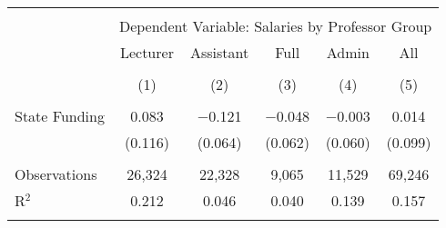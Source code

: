 
\begin{tabular}{@{\extracolsep{5pt}}lccccc} 
\\[-1.8ex]\hline 
\hline \\[-1.8ex] 
 & \multicolumn{5}{c}{Dependent Variable: Salaries by Professor Group} \\ 
\cline{2-6} 
 & Lecturer & Assistant & Full & Admin & All \\ 
\\[-1.8ex] & (1) & (2) & (3) & (4) & (5)\\ 
\hline \\[-1.8ex] 
 State Funding & 0.083 & $-$0.121 & $-$0.048 & $-$0.003 & 0.014 \\ 
  & (0.116) & (0.064) & (0.062) & (0.060) & (0.099) \\ 
 \hline \\[-1.8ex] 
Observations & 26,324 & 22,328 & 9,065 & 11,529 & 69,246 \\ 
R$^{2}$ & 0.212 & 0.046 & 0.040 & 0.139 & 0.157 \\ 
\hline 
\hline \\[-1.8ex] 
\end{tabular} 
